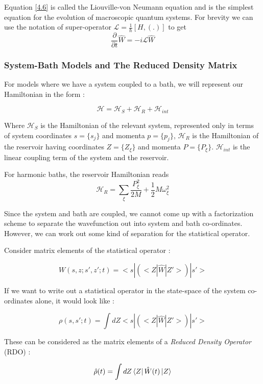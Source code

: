 Equation \ref{4.6} is called the Liouville-von Neumann equation and is the simplest equation for the evolution of macroscopic quantum systems. For brevity we can use the notation of super-operator $\mathcal{L} = \frac{1}{\hbar}[H, (.)]$ to get $$\frac{\partial}{\partial t} \hat{W} = -i \mathcal{L} \hat{W}$$

\subsubsection{System-Bath Models and The Reduced Density Matrix}

For models where we have a system coupled to a bath, we will represent our Hamiltonian in the form : 

\begin{equation} \label{4.7}
    \mathcal{H} = \mathcal{H}_S + \mathcal{H}_R + \mathcal{H}_{int}
\end{equation}

Where $\mathcal{H}_S$ is the Hamiltonian of the relevant system, represented only in terms of system coordinates $s = \{s_j\}$ and momenta $p = \{p_j\}$, $\mathcal{H}_R$ is the Hamiltonian of the reservoir having coordinates $Z = \{Z_{\xi}\}$ and momenta $P = \{P_{\xi}\}$. $\mathcal{H}_{int}$ is the linear coupling term of the system and the reservoir. 

For harmonic baths, the reservoir Hamiltonian reads $$\mathcal{H}_{R} = \sum_{\xi} \frac{P_{\xi}^2}{2M} + \frac{1}{2}M \omega_{\xi}^2$$

Since the system and bath are coupled, we cannot come up with a factorization scheme to separate the wavefunction out into system and bath co-ordinates. However, we can work out some kind of separation for the statistical operator.

Consider matrix elements of the statistical operator :

$$W(s, z ; s', z' ; t) = <s|(<Z|\hat{W}|Z'>)|s'>$$

If we want to write out a statistical operator in the state-space of the system co-ordinates alone, it would look like :

\begin{equation}
\rho(s, s' ; t) = \int dZ <s|(<Z|\hat{W}|Z'>)|s'>
\end{equation}

These can be considered as the matrix elements of a \emph{Reduced Density Operator} (RDO) :

\begin{equation}
    \hat{\rho}(t) = \int dZ \bra{Z}\hat{W}(t)\ket{Z} 
\end{equation}

